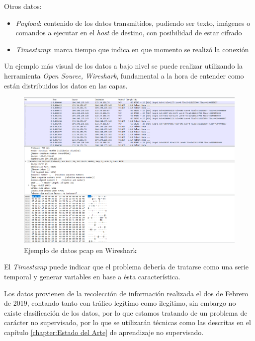 Otros datos:

\begin{itemize}
    \item \textit{Payload}: contenido de los datos transmitidos, pudiendo ser texto, imágenes o comandos a ejecutar en el \textit{host} de destino, con posibilidad de estar cifrado
    \item \textit{Timestamp}: marca tiempo que indica en que momento se realizó la conexión
\end{itemize}

Un ejemplo más visual de los datos a bajo nivel se puede realizar utilizando la herramienta \textit{Open Source, Wireshark}, fundamental a la hora de entender como están distribuidos los datos en las capas.

\begin{figure}[H]
    \centering
    \includegraphics[width=15cm]{figs/wireshark.PNG}
    \caption{Ejemplo de datos pcap en Wireshark}
    \label{fig:wireshark}
\end{figure}

El \textit{Timestamp} puede indicar que el problema debería de tratarse como una serie temporal y generar variables en base a ésta característica.

Los datos provienen de la recolección de información realizada el dos de Febrero de 2019, contando tanto con tráfico legítimo como ilegítimo, sin embargo no existe clasificación de los datos, por lo que estamos tratando de un problema de carácter no supervisado, por lo que se utilizarán técnicas como las descritas en el capítulo \ref{chapter:Estado del Arte} de aprendizaje no supervisado.

\newpage
